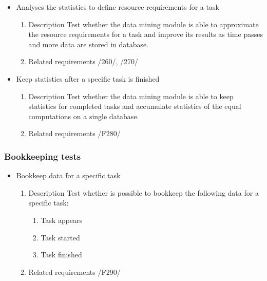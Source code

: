 {\begin{itemize}
				
				
				\item Analyses the statistics to define resource requirements for a task
				\begin{enumerate}
					\item Description\newline
Test whether the data mining module is able to approximate the resource requirements for a task and improve its results as time passes and more data are stored in database.
					\item Related requirements\newline
					/260/, /270/
				\end{enumerate}
				
				
				
				\item Keep statistics after a specific task is finished
				\begin{enumerate}
					\item Description\newline
Test whether the data mining module is able to keep statistics for completed tasks and accumulate statistics of the equal computations on a single database.
					\item Related requirements\newline
					/F280/
				\end{enumerate}
				
			
		\end{itemize}	
		\subsubsection{Bookkeeping tests}
		\begin{itemize}
		
		\item Bookkeep data for a specific task
				\begin{enumerate}
					\item Description\newline
Test whether is possible to bookkeep the following data for a specific task: 	
					\begin{enumerate}
					\item Task appears
					\item Task started
					\item Task finished 
					\end{enumerate}
					
					\item Related requirements\newline
					/F290/
				\end{enumerate}
		\end{itemize}
}
